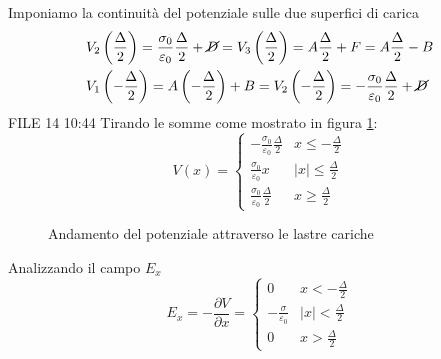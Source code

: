 Imponiamo la continuità del potenziale sulle due superfici di carica
\begin{align*}
&V_2\left(\frac{\Delta}{2}\right) = \frac{\sigma_0}{\varepsilon_0} \frac{\Delta}{2} + \cancel{D} = V_3\left(\frac{\Delta}{2}\right) = A\frac{\Delta}{2} + F = A\frac{\Delta}{2} - B\\
&V_1\left(-\frac{\Delta}{2}\right) = A\left(-\frac{\Delta}{2}\right)  + B = V_2\left(-\frac{\Delta}{2}\right) = -\frac{\sigma_0}{\varepsilon_0} \frac{\Delta}{2} + \cancel{D} 
\end{align*} FILE 14 10:44
Tirando le somme come mostrato in figura \ref{fig:potenziale_lastre_cariche}:
$$
V(x) = \begin{cases}
-\frac{\sigma_0}{\varepsilon_0}\frac{\Delta}{2} & x \leq -\frac{\Delta}{2} \\
\frac{\sigma_0}{\varepsilon_0}x & |x| \leq \frac{\Delta}{2} \\
\frac{\sigma_0}{\varepsilon_0} \frac{\Delta}{2} & x\geq \frac{\Delta}{2}
\end{cases}
$$
\begin{figure}[h] %
\centering
{}
\caption{Andamento del potenziale attraverso le lastre cariche}
\label{fig:potenziale_lastre_cariche}
\end{figure}

Analizzando il campo $E_x$
$$
E_x = -\frac{\partial V}{\partial x} = \begin{cases}
0 & x < -\frac{\Delta}{2} \\
-\frac{\sigma}{\varepsilon_0} & |x| < \frac{\Delta}{2} \\
0 & x > \frac{\Delta}{2}
\end{cases}
$$

